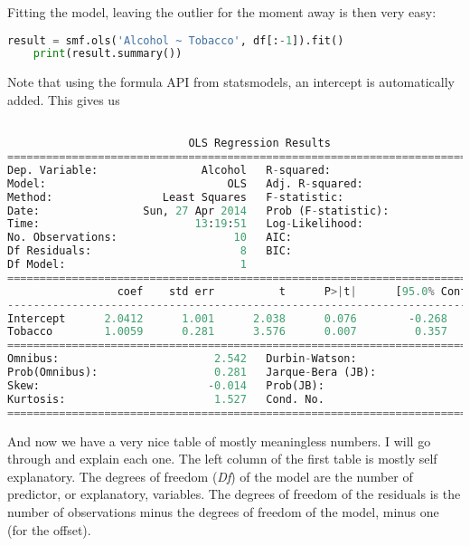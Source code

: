 Fitting the model, leaving the outlier for the moment away is then very easy:

\begin{lstlisting}[language=Python]
    result = smf.ols('Alcohol ~ Tobacco', df[:-1]).fit()
    print(result.summary())
\end{lstlisting}

Note that using the formula API from statsmodels, an intercept is automatically added.  This gives us
\small\begin{lstlisting}[language=Python]

                            OLS Regression Results
==============================================================================
Dep. Variable:                Alcohol   R-squared:                       0.615
Model:                            OLS   Adj. R-squared:                  0.567
Method:                 Least Squares   F-statistic:                     12.78
Date:                Sun, 27 Apr 2014   Prob (F-statistic):            0.00723
Time:                        13:19:51   Log-Likelihood:                -4.9998
No. Observations:                  10   AIC:                             14.00
Df Residuals:                       8   BIC:                             14.60
Df Model:                           1
==============================================================================
                 coef    std err          t      P>|t|      [95.0% Conf. Int.]
------------------------------------------------------------------------------
Intercept      2.0412      1.001      2.038      0.076        -0.268     4.350
Tobacco        1.0059      0.281      3.576      0.007         0.357     1.655
==============================================================================
Omnibus:                        2.542   Durbin-Watson:                   1.975
Prob(Omnibus):                  0.281   Jarque-Bera (JB):                0.904
Skew:                          -0.014   Prob(JB):                        0.636
Kurtosis:                       1.527   Cond. No.                         27.2
==============================================================================
\end{lstlisting}
\normalsize


And now we have a very nice table of mostly meaningless numbers. I will go through and explain each one. The left column of the first table is mostly self explanatory. The degrees of freedom (\emph{Df}) of the model are the number of predictor, or explanatory, variables. The degrees of freedom of the residuals is the number of observations minus the degrees of freedom of the model, minus one (for the offset).

